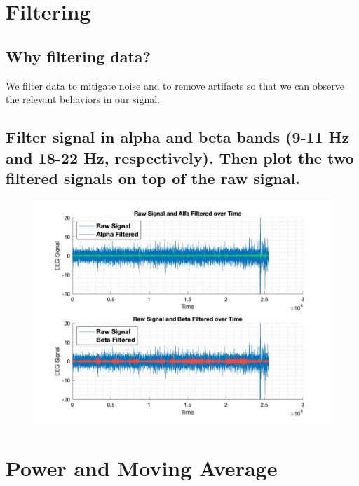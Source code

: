 \documentclass[12pt]{article}
\begin{document}
\section{Filtering}
\subsection{Why filtering data?}
We filter data to mitigate noise and to remove artifacts so that we can observe the relevant behaviors in our signal.\clearpage

\subsection{Filter signal in alpha and beta bands (9-11 Hz and 18-22 Hz, respectively). Then plot the two filtered signals on top of the raw signal.}

\begin{figure}[!htb]
    \includegraphics[scale=0.4]{alpha_beta}
\end{figure}\clearpage

\section{Power and Moving Average}
\end{document}
